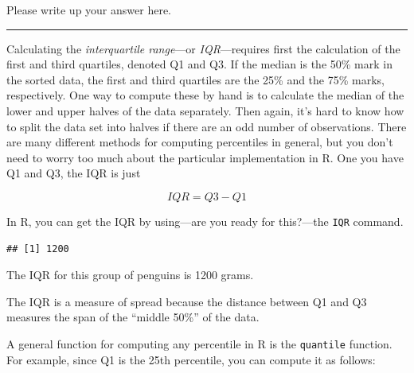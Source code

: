 \documentclass[
]{book}
\newenvironment{Shaded}{\begin{snugshade}}{\end{snugshade}}
\newcommand{\AttributeTok}[1]{\textcolor[rgb]{0.77,0.63,0.00}{#1}}
\newcommand{\ConstantTok}[1]{\textcolor[rgb]{0.00,0.00,0.00}{#1}}
\newcommand{\FloatTok}[1]{\textcolor[rgb]{0.00,0.00,0.81}{#1}}
\newcommand{\FunctionTok}[1]{\textcolor[rgb]{0.00,0.00,0.00}{#1}}
\newcommand{\NormalTok}[1]{#1}
\newcommand{\OtherTok}[1]{\textcolor[rgb]{0.56,0.35,0.01}{#1}}
\newcommand{\SpecialCharTok}[1]{\textcolor[rgb]{0.00,0.00,0.00}{#1}}
\begin{document}
Please write up your answer here.

\begin{center}\rule{0.5\linewidth}{0.5pt}\end{center}

Calculating the \emph{interquartile range}---or \emph{IQR}---requires first the calculation of the first and third quartiles, denoted Q1 and Q3. If the median is the 50\% mark in the sorted data, the first and third quartiles are the 25\% and the 75\% marks, respectively. One way to compute these by hand is to calculate the median of the lower and upper halves of the data separately. Then again, it's hard to know how to split the data set into halves if there are an odd number of observations. There are many different methods for computing percentiles in general, but you don't need to worry too much about the particular implementation in R. One you have Q1 and Q3, the IQR is just

\[
IQR = Q3 - Q1
\]

In R, you can get the IQR by using---are you ready for this?---the \texttt{IQR} command.

\begin{Shaded}
\end{Shaded}

\begin{verbatim}
## [1] 1200
\end{verbatim}

The IQR for this group of penguins is 1200 grams.

The IQR is a measure of spread because the distance between Q1 and Q3 measures the span of the ``middle 50\%'' of the data.

A general function for computing any percentile in R is the \texttt{quantile} function. For example, since Q1 is the 25th percentile, you can compute it as follows:

\begin{Shaded}
\end{Shaded}
\end{document}
